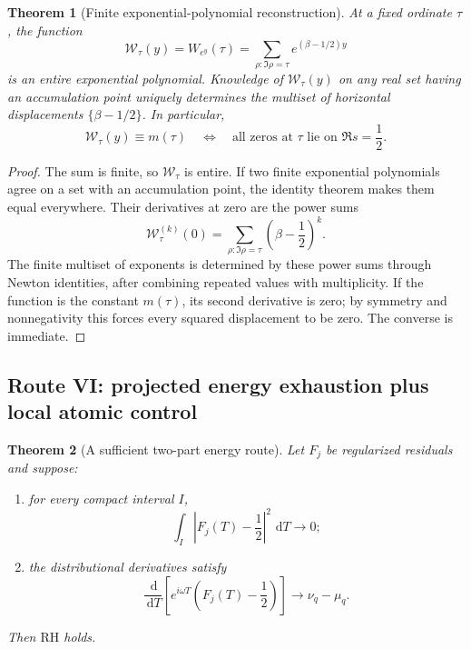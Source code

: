 \documentclass[11pt]{amsart}
\numberwithin{equation}{section}
\theoremstyle{plain}
\newtheorem{theorem}{Theorem}[section]
\theoremstyle{definition}
\theoremstyle{remark}
\newcommand{\RH}{\mathrm{RH}}
\newcommand{\1}{\mathbf{1}}
\newcommand{\dd}{\,\mathrm{d}}
\begin{document}
\begin{theorem}[Finite exponential-polynomial reconstruction]
\label{thm:q_family_reconstruction}
At a fixed ordinate \(\tau\), the function
\begin{equation}
\mathcal W_\tau(y)
=
W_{e^y}(\tau)
=
\sum_{\rho:\Im\rho=\tau}
e^{(\beta-1/2)y}
\label{eq:q_family_exponential_polynomial}
\end{equation}
is an entire exponential polynomial.  Knowledge of
\(\mathcal W_\tau(y)\) on any real set having an accumulation point
uniquely determines the multiset of horizontal displacements
\(\{\beta-1/2\}\).  In particular,
\begin{equation}
\mathcal W_\tau(y)\equiv m(\tau)
\quad\Longleftrightarrow\quad
\text{all zeros at }\tau\text{ lie on }\Re s=\frac12.
\label{eq:q_family_constant_criterion}
\end{equation}
\end{theorem}

\begin{proof}
The sum is finite, so \(\mathcal W_\tau\) is entire.  If two finite
exponential polynomials agree on a set with an accumulation point, the
identity theorem makes them equal everywhere.  Their derivatives at zero
are the power sums
\begin{equation}
\mathcal W_\tau^{(k)}(0)
=
\sum_{\rho:\Im\rho=\tau}
\left(\beta-\frac12\right)^k.
\label{eq:q_family_power_sums}
\end{equation}
The finite multiset of exponents is determined by these power sums through
Newton identities, after combining repeated values with multiplicity.  If
the function is the constant \(m(\tau)\), its second derivative is zero;
by symmetry and nonnegativity this forces every squared displacement to be
zero.  The converse is immediate.
\end{proof}

\subsection{Route VI: projected energy exhaustion plus local atomic control}
\label{subsec:route_energy_local}

\begin{theorem}[A sufficient two-part energy route]
\label{thm:energy_local_route}
Let \(F_j\) be regularized residuals and suppose:
\begin{enumerate}[label=\textup{(\roman*)}]
\item for every compact interval \(I\),
\begin{equation}
\int_I\left|F_j(T)-\frac12\right|^2\,\dd T
\longrightarrow0;
\label{eq:energy_route_local_L2}
\end{equation}
\item the distributional derivatives satisfy
\begin{equation}
\frac{\dd}{\dd T}
\left[e^{i\omega T}\left(F_j(T)-\frac12\right)\right]
\longrightarrow
\nu_q-\mu_q.
\label{eq:energy_route_derivative}
\end{equation}
\end{enumerate}
Then \(\RH\) holds.
\end{theorem}
\end{document}
